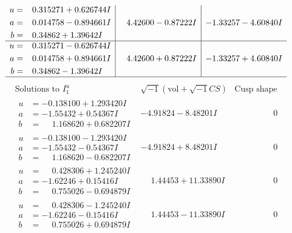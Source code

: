 \documentclass[1p]{elsarticle_modified}
\theoremstyle{definition}
\newcommand{\I}{\sqrt{-1}}
\begin{document}
$$\begin{array}{c|c|c}
\begin{aligned}
u &= \phantom{-}0.315271 + 0.626744 I \\
a &= \phantom{-}0.014758 - 0.894661 I \\
b &= \phantom{-}0.34862 + 1.39642 I\end{aligned}
 & \phantom{-}4.42600 - 0.87222 I & -1.33257 - 4.60840 I \\ \hline\begin{aligned}
u &= \phantom{-}0.315271 - 0.626744 I \\
a &= \phantom{-}0.014758 + 0.894661 I \\
b &= \phantom{-}0.34862 - 1.39642 I\end{aligned}
 & \phantom{-}4.42600 + 0.87222 I & -1.33257 + 4.60840 I\\
 \hline 
 \end{array}$$\newpage$$\begin{array}{c|c|c}  
\text{Solutions to }I^u_{1}& \I (\text{vol} + \sqrt{-1}CS) & \text{Cusp shape}\\
 \hline 
\begin{aligned}
u &= -0.138100 + 1.293420 I \\
a &= -1.55432 + 0.54367 I \\
b &= \phantom{-}1.168620 + 0.682207 I\end{aligned}
 & -4.91824 - 8.48201 I & \phantom{-0.000000 } 0 \\ \hline\begin{aligned}
u &= -0.138100 - 1.293420 I \\
a &= -1.55432 - 0.54367 I \\
b &= \phantom{-}1.168620 - 0.682207 I\end{aligned}
 & -4.91824 + 8.48201 I & \phantom{-0.000000 } 0 \\ \hline\begin{aligned}
u &= \phantom{-}0.428306 + 1.245240 I \\
a &= -1.62246 + 0.15416 I \\
b &= \phantom{-}0.755026 - 0.694879 I\end{aligned}
 & \phantom{-}1.44453 + 11.33890 I & \phantom{-0.000000 } 0 \\ \hline\begin{aligned}
u &= \phantom{-}0.428306 - 1.245240 I \\
a &= -1.62246 - 0.15416 I \\
b &= \phantom{-}0.755026 + 0.694879 I\end{aligned}
 & \phantom{-}1.44453 - 11.33890 I & \phantom{-0.000000 } 0 \\ \hline\begin{aligned}

\end{aligned}
\end{array}$$
\end{document}
